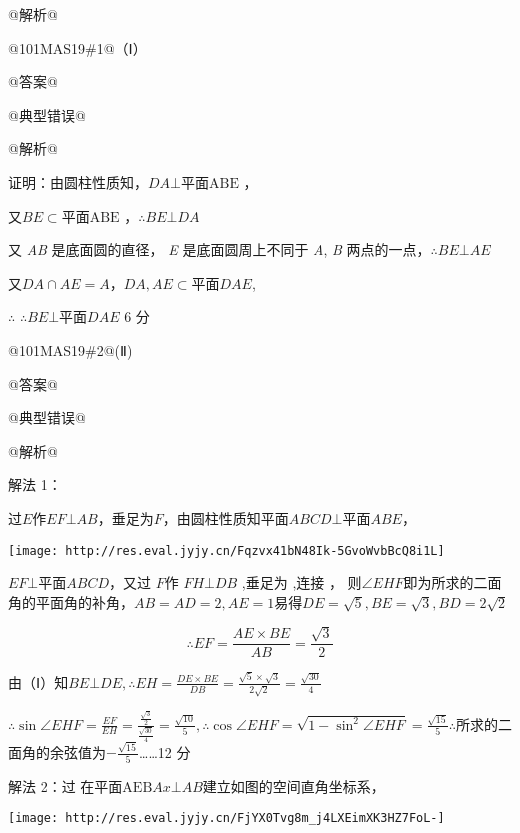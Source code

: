 \documentclass{scrbook}
\begin{document}
@解析@

@101MA{\textbar}S19\#1@（Ⅰ）

@答案@

@典型错误@

@解析@

证明：由圆柱性质知，$DA\bot \text{平面ABE}$ ，

又$BE\subset \text{平面ABE}$ ，$\therefore BE\bot DA$

又 \textit{AB} 是底面圆的直径， \textit{E} 是底面圆周上不同于 \textit{A}, \textit{B} 两点的一点，$\therefore BE\bot AE$

又$DA\cap AE=A$，$DA,AE\subset \mathrm{平面}DAE$,

${\therefore}$ $\therefore BE\bot \mathrm{平面}DAE$ 6 分

@101MA{\textbar}S19\#2@(Ⅱ)

@答案@

@典型错误@

@解析@

解法 1：

过$E$作$EF\bot AB$，垂足为$F$，由圆柱性质知$\mathrm{平面}ABCD\bot \mathrm{平面}ABE$，

 \texttt{[image: http://res.eval.jyjy.cn/Fqzvx41bN48Ik-5GvoWvbBcQ8i1L]}

\raisebox{0.5pt}{${\therefore}$} $EF\bot \mathrm{平面}ABCD$，又过 $F$作 $FH\bot DB$ ,垂足为 \textit{\raisebox{0.5pt}{H}} ,连接 \textit{\raisebox{0.5pt}{EH}} ， 则$\angle EHF$即为所求的二面角的平面角的补角，$AB=AD=2,AE=1$易得$DE=\sqrt{5},BE=\sqrt{3},BD=2\sqrt{2}$

\begin{equation*}
\therefore EF=\frac{AE\times BE}{AB}=\frac{\sqrt{3}}{2}
\end{equation*}

由（Ⅰ）知$BE\bot DE,\therefore EH=\frac{DE\times BE}{DB}=\frac{\sqrt{5}\times \sqrt{3}}{2\sqrt{2}}=\frac{\sqrt{30}}{4}$

$\therefore \sin \angle EHF=\frac{EF}{EH}=\frac{\frac{\sqrt{3}}{2}}{\frac{\sqrt{30}}{4}}=\frac{\sqrt{10}}{5},\therefore \cos \angle EHF=\sqrt{1- \sin ^{2}\angle EHF}=\frac{\sqrt{15}}{5}$${\therefore}$所求的二面角的余弦值为$- \frac{\sqrt{15}}{5}${\ldots}{\ldots}12 分

解法 2：过 \textit{\raisebox{0.5pt}{A}} 在平面$\mathrm{AEB}$\raisebox{-1.5pt}{作}$Ax\bot AB$\raisebox{-1.5pt}{，}建立如图的空间直角坐标系，

\texttt{[image: http://res.eval.jyjy.cn/FjYX0Tvg8m\_j4LXEimXK3HZ7FoL-]}
\end{document}
